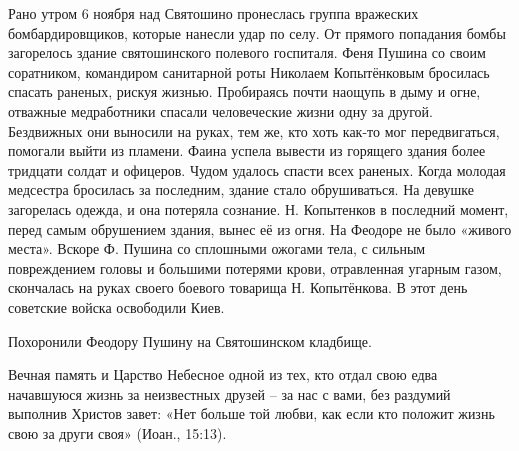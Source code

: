 Рано утром 6 ноября над Святошино пронеслась группа вражеских бомбардировщиков,
которые нанесли удар по селу. От прямого попадания бомбы загорелось здание
святошинского полевого госпиталя. Феня Пушина со своим соратником, командиром
санитарной роты Николаем Копытёнковым бросилась спасать раненых, рискуя жизнью.
Пробираясь почти наощупь в дыму и огне, отважные медработники спасали
человеческие жизни одну за другой. Бездвижных они выносили на руках, тем же,
кто хоть как-то мог передвигаться, помогали выйти из пламени. Фаина успела
вывести из горящего здания более тридцати солдат и офицеров. Чудом удалось
спасти всех раненых. Когда молодая медсестра бросилась за последним, здание
стало обрушиваться. На девушке загорелась одежда, и она потеряла сознание. Н.
Копытенков в последний момент, перед самым обрушением здания, вынес её из огня.
На Феодоре не было «живого места». Вскоре Ф. Пушина со сплошными ожогами тела,
с сильным повреждением головы и большими потерями крови, отравленная угарным
газом, скончалась на руках своего боевого товарища Н. Копытёнкова. В этот день
советские войска освободили Киев. 

Похоронили Феодору Пушину на Святошинском кладбище.

Вечная память и Царство Небесное одной из тех, кто отдал свою едва начавшуюся
жизнь за неизвестных друзей – за нас с вами, без раздумий выполнив Христов
завет: «Нет больше той любви, как если кто положит жизнь свою за други своя»
(Иоан., 15:13).
